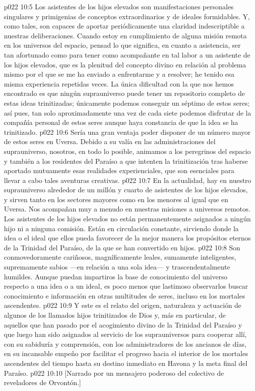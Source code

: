 \vs p022 10:5 \pc Los asistentes de los hijos elevados son manifestaciones personales singulares y primigenias de conceptos extraordinarios y de ideales formidables. Y, como tales, son capaces de aportar periódicamente una claridad indescriptible a nuestras deliberaciones. Cuando estoy en cumplimiento de alguna misión remota en los universos del espacio, pensad lo que significa, en cuanto a asistencia, ser tan afortunado como para tener como acompañante en tal labor a un asistente de los hijos elevados, que es la plenitud del concepto divino en relación al problema mismo por el que se me ha enviado a enfrentarme y a resolver; he tenido esa misma experiencia repetidas veces. La única dificultad con la que nos hemos encontrado es que ningún suprauniverso puede tener un repositorio completo de estas ideas trinitizadas; únicamente podemos conseguir un séptimo de estos seres; así pues, tan solo aproximadamente una vez de cada siete podemos disfrutar de la compañía personal de estos seres aunque haya constancia de que la idea se ha trinitizado.
\vs p022 10:6 Sería una gran ventaja poder disponer de un número mayor de estos seres en Uversa. Debido a su valía en las administraciones del suprauniverso, nosotros, en todo lo posible, animamos a los peregrinos del espacio y también a los residentes del Paraíso a que intenten la trinitización tras haberse aportado mutuamente esas realidades experienciales, que son esenciales para llevar a cabo tales aventuras creativas.
\vs p022 10:7 \pc En la actualidad, hay en nuestro suprauniverso alrededor de un millón y cuarto de asistentes de los hijos elevados, y sirven tanto en los sectores mayores como en los menores al igual que en Uversa. Nos acompañan muy a menudo en nuestras misiones a universos remotos. Los asistentes de los hijos elevados no están permanentemente asignados a ningún hijo ni a ninguna comisión. Están en circulación constante, sirviendo donde la idea o el ideal que ellos  pueda favorecer de la mejor manera los propósitos eternos de la Trinidad del Paraíso, de la que se han convertido en hijos.
\vs p022 10:8 Son conmovedoramente cariñosos, magníficamente leales, sumamente inteligentes, supremamente sabios ---en relación a una sola idea--- y trascendentalmente humildes. Aunque puedan impartiros la base de conocimiento del universo respecto a una idea o a un ideal, es poco menos que lastimoso observarlos buscar conocimiento e información en otras multitudes de seres, incluso en los mortales ascendentes.
\vs p022 10:9 \pc Y este es el relato del origen, naturaleza y actuación de algunos de los llamados hijos trinitizados de Dios y, más en particular, de aquellos que han pasado por el acogimiento divino de la Trinidad del Paraíso y que luego han sido asignados al servicio de los suprauniversos para cooperar allí, con su sabiduría y comprensión, con los administradores de los ancianos de días, en su incansable empeño por facilitar el progreso hacia el interior de los mortales ascendentes del tiempo hasta su destino inmediato en Havona y la meta final del Paraíso.
\vsetoff
\vs p022 10:10 [Narrado por un mensajero poderoso del colectivo de reveladores de Orvontón.]

